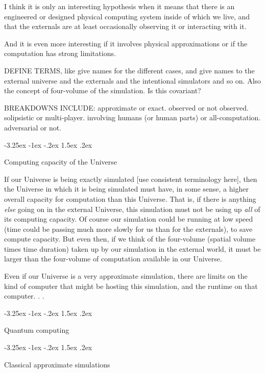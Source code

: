 \documentclass[letterpaper]{article}
\makeatletter
\renewcommand\section{\@startsection {section}{1}{\z@}%
  {-3.25ex \@plus -1ex \@minus -.2ex}%
  {1.5ex \@plus .2ex}%
  {\raggedright\normalfont\large\bfseries}}
\makeatother
\begin{document}
I think it is only an interesting hypothesis when it means that there is an engineered or designed physical computing system inside of which we live, and that the externals are at least occasionally observing it or interacting with it.

And it is even more interesting if it involves physical approximations or if the computation has strong limitations.

DEFINE TERMS, like give names for the different cases, and give names to the external universe and the externals and the intentional simulators and so on. Also the concept of four-volume of the simulation. Is this covariant?

BREAKDOWNS INCLUDE: approximate or exact. observed or not observed. solipsistic or multi-player. involving humans (or human parts) or all-computation. adversarial or not.

\section{Computing capacity of the Universe}

If our Universe is being exactly simulated [use consistent terminology here], then the Universe in which it is being simulated must have, in some sense, a higher overall capacity for computation than this Universe.
That is, if there is anything \emph{else} going on in the external Universe, this simulation must not be using up \emph{all} of its computing capacity.
Of course our simulation could be running at low speed (time could be passing much more slowly for us than for the externals), to save compute capacity.
But even then, if we think of the four-volume (spatial volume times time duration) taken up by our simulation in the external world, it must be larger than the four-volume of computation available in our Universe.

Even if our Universe is a very approximate simulation, there are limits on the kind of computer that might be hosting this simulation, and the runtime on that computer. .  .


\section{Quantum computing}

\section{Classical approximate simulations}
\end{document}
